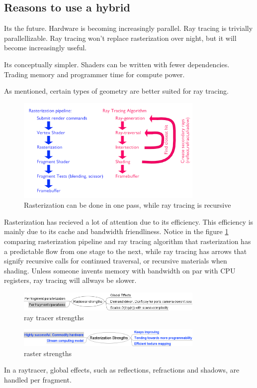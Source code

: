 \subsection{Reasons to use a hybrid}

Its the future. Hardware is becoming increasingly parallel. Ray tracing is trivially parallellizable. Ray tracing won't replace rasterization over night, but it will become increasingly useful.

Its conceptually simpler. Shaders can be written with fewer dependencies. Trading memory and programmer time for compute power.

As mentioned, certain types of geometry are better suited for ray tracing.

	\begin{figure}[ht]
		\centering
		\includegraphics[width=0.80\textwidth]{Media/why_hybrid_pipeline_diffs.png}
		\caption{Rasterization can be done in one pass, while ray tracing is recursive}
		\label{fig:pipelines}
	\end{figure}

Rasterization has recieved a lot of attention due to its efficiency. This efficiency is mainly due to its cache and bandwidth friendliness. Notice in the figure \ref{fig:pipelines} comparing rasterization pipeline and ray tracing algorithm that rasterization has a predictable flow from one stage to the next, while ray tracing has arrows that signify recursive calls for continued traversal, or recursive materials when shading. Unless someone invents memory with bandwidth on par with CPU registers, ray tracing will allways be slower.

	\begin{figure}[ht]
		\centering \includegraphics[width=0.80\textwidth]{Media/why_hybrid_raymindmap.png}
		\caption{ray tracer strengths}
		\label{fig:ray_mmap}
	\end{figure}
	
	\begin{figure}[ht]
		\centering \includegraphics[width=0.80\textwidth]{Media/why_hybrid_rastermindmap.png}
		\caption{raster strengths}
		\label{fig:raster_mmap}
	\end{figure}

In a raytracer, global effects, such as reflections, refractions and shadows, are handled per fragment.